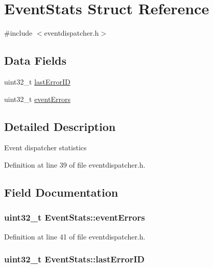 \hypertarget{struct_event_stats}{\section{\-Event\-Stats \-Struct \-Reference}
\label{struct_event_stats}
}


{\ttfamily \#include $<$eventdispatcher.\-h$>$}

\subsection*{\-Data \-Fields}
\begin{DoxyCompactItemize}
\item 
uint32\-\_\-t \hyperlink{struct_event_stats_a14d4a710533bb544b4fe350b842dfc9f}{last\-Error\-I\-D}
\item 
uint32\-\_\-t \hyperlink{struct_event_stats_a4734c9ef93875b98d9bb205537242be4}{event\-Errors}
\end{DoxyCompactItemize}


\subsection{\-Detailed \-Description}
\-Event dispatcher statistics 

\-Definition at line 39 of file eventdispatcher.\-h.



\subsection{\-Field \-Documentation}
\hypertarget{struct_event_stats_a4734c9ef93875b98d9bb205537242be4}{
\subsubsection[{event\-Errors}]{\setlength{\rightskip}{0pt plus 5cm}uint32\-\_\-t {\bf \-Event\-Stats\-::event\-Errors}}}\label{struct_event_stats_a4734c9ef93875b98d9bb205537242be4}


\-Definition at line 41 of file eventdispatcher.\-h.

\hypertarget{struct_event_stats_a14d4a710533bb544b4fe350b842dfc9f}{
\subsubsection[{last\-Error\-I\-D}]{\setlength{\rightskip}{0pt plus 5cm}uint32\-\_\-t {\bf \-Event\-Stats\-::last\-Error\-I\-D}}}\label{struct_event_stats_a14d4a710533bb544b4fe350b842dfc9f}


